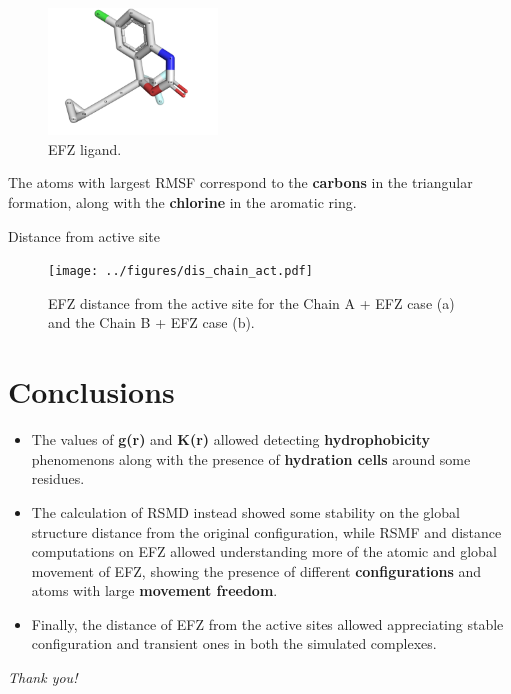 \documentclass{beamer}
\begin{document}
\begin{frame}
    \begin{figure}
        \centering
        \includegraphics[width=0.4\textwidth]{../figures/efz.png}
        \caption{EFZ ligand.\label{fig:efz}}
    \end{figure}

    The atoms with largest RMSF correspond to the \textbf{carbons}  in the triangular formation, along with the \textbf{chlorine}  in the aromatic ring. 
\end{frame}

\begin{frame}{Distance from active site}
    \begin{figure}[H]
        \centering
        \texttt{[image: ../figures/dis\_chain\_act.pdf]}
        \caption{EFZ distance from the active site for the Chain A + EFZ case (a) and the Chain B + EFZ case (b).\label{fig:dist}}
    \end{figure}
\end{frame}

\section{Conclusions}

\begin{frame}

    \begin{itemize}
        \item The values of \textbf{g(r)}  and \textbf{K(r)} allowed detecting \textbf{hydrophobicity}  phenomenons along with the presence of \textbf{hydration cells}  around some residues.
        \item The calculation of RSMD instead showed some stability on the global structure distance from the original configuration, while RSMF and distance computations on EFZ allowed understanding more of the atomic and global movement of EFZ, showing the presence of different \textbf{configurations} and atoms with large \textbf{movement freedom}.
        \item Finally, the distance of EFZ from the active sites allowed appreciating stable configuration and transient ones in both the simulated complexes.
    \end{itemize}

\end{frame}

\begin{frame}{}
    \centering \Large
\emph{Thank you!}
  \end{frame}
  
\end{document}
